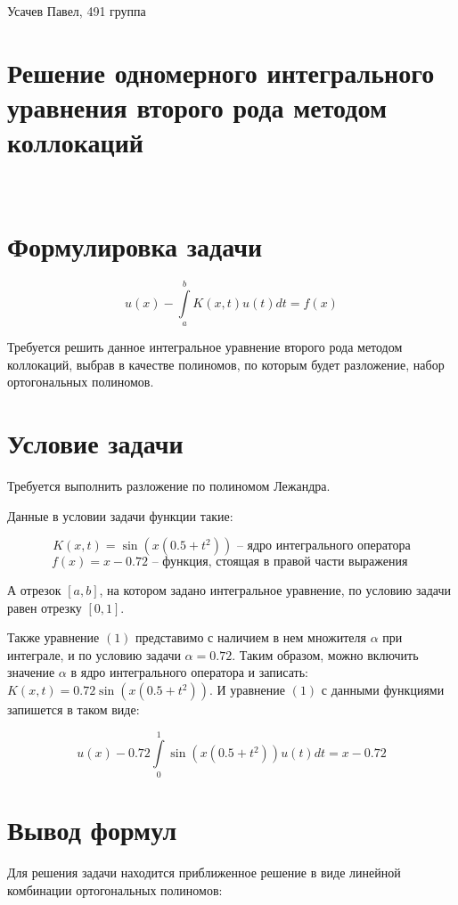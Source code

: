 \documentclass[12pt,a4paper]{article}
\begin{document}
\begin{flushleft}
\large Усачев Павел, 491 группа
\end{flushleft}

\section*{Решение одномерного интегрального уравнения второго рода методом коллокаций}

\

\section{Формулировка задачи}

\begin{equation}
 u(x) - \int\limits_a^b K(x,t) u(t) dt = f(x)
\end{equation}

Требуется решить данное интегральное уравнение второго рода методом коллокаций, выбрав в качестве полиномов, по которым будет разложение, набор ортогональных полиномов.

\section{Условие задачи}

Требуется выполнить разложение по полиномом Лежандра.

Данные в условии задачи функции такие:

$$ K(x,t) = \sin (x(0.5+t^2)) \text{ \ \ -- \  ядро интегрального оператора} $$ 
$$ f(x) = x - 0.72 \text{ \ \ -- \ функция, стоящая в правой части выражения } $$

А отрезок $[a,b]$, на котором задано интегральное уравнение, по условию задачи равен отрезку $[0,1]$.

Также уравнение $(1)$ представимо с наличием в нем множителя $\alpha$ при интеграле, и по условию задачи $\alpha = 0.72$. Таким образом, можно включить значение $\alpha$ в ядро интегрального оператора и записать: $K(x,t) = 0.72 \sin (x(0.5+t^2))$. И уравнение $(1)$ с данными функциями запишется в таком виде:

$$
 u(x) - 0.72 \int\limits_0^1 \sin (x(0.5+t^2)) u(t) dt = x - 0.72
$$

\section{Вывод формул}

Для решения задачи находится приближенное решение в виде линейной комбинации ортогональных полиномов:
 
\end{document}
